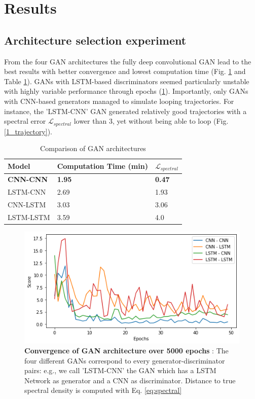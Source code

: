 \documentclass{article}
\begin{document}
\section{Results}
\subsection{Architecture selection experiment}
From the four GAN architectures the fully deep convolutional GAN lead to the best results with better convergence and lowest computation time (Fig. \ref{1_score} and Table \ref{tab_score}). GANs with LSTM-based discriminators seemed particularly unstable with highly variable performance through epochs (\ref{1_score}). Importantly, only GANs with CNN-based generators managed to simulate looping trajectories. For instance, the 'LSTM-CNN' GAN generated relatively good trajectories with a spectral error $\mathcal{L}_{spectral}$ lower than 3, yet without being able to loop (Fig. \ref{1_trajectory}).

\begin{table}[h]
  \centering
  \caption{Comparison of GAN architectures}
  \begin{tabular}{l|ll}
    \toprule
    Model  &  Computation Time (min) & $\mathcal{L}_{spectral}$ \\
    \midrule
    \textbf{CNN-CNN} & \textbf{1.95} & \textbf{0.47} \\
    LSTM-CNN & 2.69 & 1.93 \\
    CNN-LSTM & 3.03 & 3.06 \\
    LSTM-LSTM & 3.59 & 4.0 \\
    \bottomrule
  \end{tabular}
  \label{tab_score}
\end{table}


\begin{figure}[h]
  \centering
  \includegraphics[scale=0.5]{1_score.png}
  \caption{\textbf{Convergence of GAN architecture over 5000 epochs} : The four different GANs correspond to every generator-discriminator pairs: e.g., we call 'LSTM-CNN' the GAN which has a LSTM Network as generator and a CNN as discriminator. Distance to true spectral density is computed with Eq. \ref{eq:spectral}}
  \label{1_score}
\end{figure}
\end{document}

